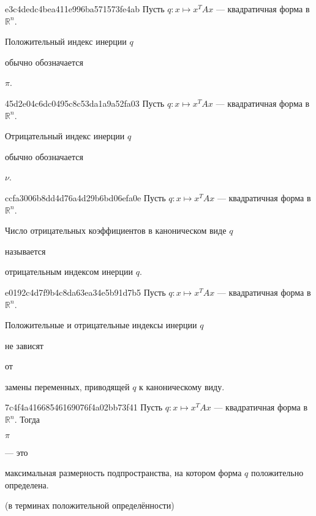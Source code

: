 \begin{note}{e3c4dedc4bea411e996ba571573fe4ab}
    Пусть \({ q : x \mapsto x^{T}Ax }\) --- квадратичная форма в \({ \mathbb R^{n} }\).
    \begin{icloze}{2}Положительный индекс инерции \({ q }\)\end{icloze} обычно обозначается \begin{icloze}{1}\({ \pi }\).\end{icloze}
\end{note}

\begin{note}{45d2e04c6dc0495c8c53da1a9a52fa03}
    Пусть \({ q : x \mapsto x^{T}Ax }\) --- квадратичная форма в \({ \mathbb R^{n} }\).
    \begin{icloze}{2}Отрицательный индекс инерции \({ q }\)\end{icloze} обычно обозначается \begin{icloze}{1}\({ \nu }\).\end{icloze}
\end{note}

\begin{note}{ccfa3006b8dd4d76a4d29b6bd06efa0e}
    Пусть \({ q : x \mapsto x^{T}Ax }\) --- квадратичная форма в \({ \mathbb R^{n} }\).
    \begin{icloze}{1}Число отрицательных коэффициентов в каноническом виде \({ q }\)\end{icloze} называется \begin{icloze}{2}отрицательным индексом инерции \({ q }\).\end{icloze}
\end{note}

\begin{note}{e0192c4d7f9b4c8da63ea34e5b91d7b5}
    Пусть \({ q : x \mapsto x^{T}Ax }\) --- квадратичная форма в \({ \mathbb R^{n} }\).
    \begin{icloze}{3}Положительные и отрицательные индексы инерции \({ q }\)\end{icloze} \begin{icloze}{2}не зависят\end{icloze} от \begin{icloze}{1}замены переменных, приводящей \({ q }\) к каноническому виду.\end{icloze}
\end{note}

\begin{note}{7c4f4a41668546169076f4a02bb73f41}
    Пусть \({ q : x \mapsto x^{T}Ax }\) --- квадратичная форма в \({ \mathbb R^{n} }\).
    Тогда \begin{icloze}{2}\({ \pi }\)\end{icloze} --- это \begin{icloze}{1}максимальная размерность подпространства, на котором форма \({ q }\) положительно определена.\end{icloze}

    \begin{center}
        \tiny
        (в терминах положительной определённости)
    \end{center}
\end{note}

